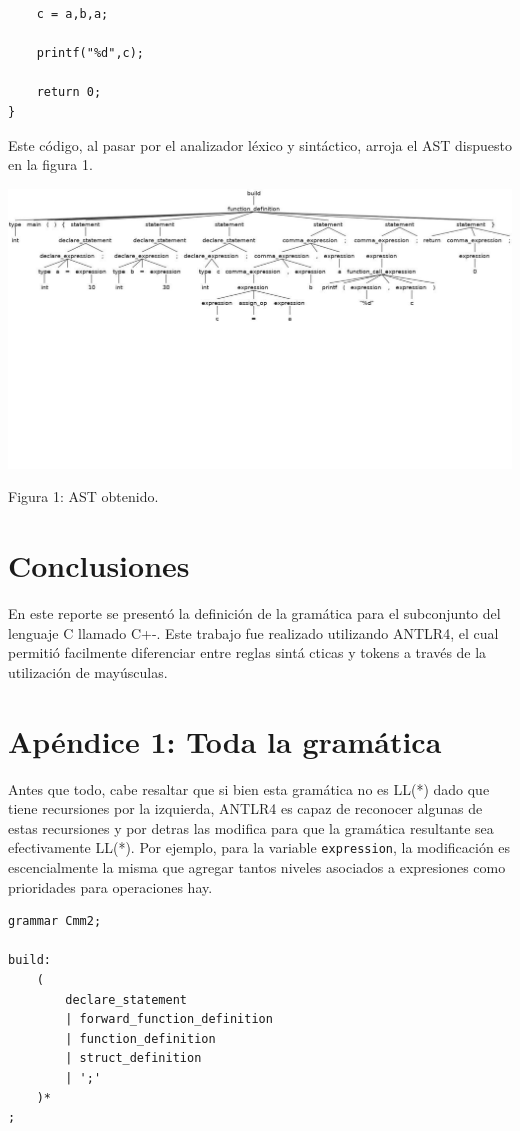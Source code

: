 \documentclass[12pt]{article}
\begin{document}
\begin{itemize}
\begin{verbatim}
    c = a,b,a;
    
    printf("%d",c);

    return 0;
}
\end{verbatim}
Este c\'odigo, al pasar por el analizador l\'exico y sint\'actico, arroja el AST dispuesto en la figura 1.


\centerline{\includegraphics[trim={0 9cm 0 0},scale=0.45]{arbol1.jpg}}
\centerline{Figura 1: AST obtenido.}
\clearpage

\section*{Conclusiones}
En este reporte se presentó la definición de la gramática para el subconjunto del lenguaje C llamado C+-. Este trabajo fue realizado utilizando ANTLR4, el cual permitió facilmente diferenciar entre reglas sint\'a cticas y tokens a trav\'es de la utilizaci\'on de may\'usculas.

\section*{Ap\'endice 1: Toda la gram\'atica}
Antes que todo, cabe resaltar que si bien esta gram\'atica no es LL(*) dado que tiene recursiones por la izquierda, ANTLR4 es capaz de reconocer algunas de estas recursiones y por detras las modifica para que la gram\'atica resultante sea efectivamente LL(*). Por ejemplo, para la variable \texttt{expression}, la modificaci\'on es escencialmente la misma que agregar tantos niveles asociados a expresiones como prioridades para operaciones hay.
\begin{verbatim}
grammar Cmm2;

build:
    (
        declare_statement
        | forward_function_definition
        | function_definition
        | struct_definition
        | ';'
    )*
;


\end{verbatim}
\end{itemize}
\end{document}
